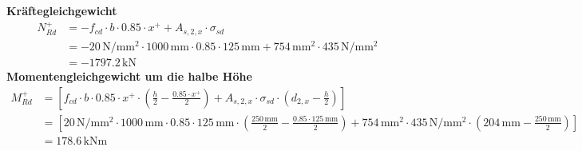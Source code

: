 \documentclass[11pt,a4paper]{article}
\begin{document}
\noindent\textbf{Kräftegleichgewicht}
\begin{equation*}
\begin{aligned}
  N_{Rd}^{+} &= -f_{cd} \cdot b \cdot 0.85 \cdot x^{+} + A_{s,2,x} \cdot \sigma_{sd} \\
  &= -20\,\mathrm{N}/\mathrm{mm}^{2} \cdot 1000\,\mathrm{mm} \cdot 0.85 \cdot 125\,\mathrm{mm} + 754\,\mathrm{mm}^{2} \cdot 435\,\mathrm{N}/\mathrm{mm}^{2} \\
  &= -1797.2\,\mathrm{kN}
\end{aligned}
\end{equation*}
\noindent\textbf{Momentengleichgewicht um die halbe Höhe}
\begin{equation*}
\begin{aligned}
  M_{Rd}^{+} &= \left[f_{cd} \cdot b \cdot 0.85 \cdot x^{+} \cdot \left(\tfrac{h}{2} - \tfrac{0.85 \cdot x^{+}}{2}\right) + A_{s,2,x} \cdot \sigma_{sd} \cdot \left(d_{2,x} - \tfrac{h}{2}\right)\right] \\
  &= \left[20\,\mathrm{N}/\mathrm{mm}^{2} \cdot 1000\,\mathrm{mm} \cdot 0.85 \cdot 125\,\mathrm{mm} \cdot \left(\tfrac{250\,\mathrm{mm}}{2} - \tfrac{0.85 \cdot 125\,\mathrm{mm}}{2}\right) + 754\,\mathrm{mm}^{2} \cdot 435\,\mathrm{N}/\mathrm{mm}^{2} \cdot \left(204\,\mathrm{mm} - \tfrac{250\,\mathrm{mm}}{2}\right)\right] \\
  &= 178.6\,\mathrm{kNm}
\end{aligned}
\end{equation*}
\end{document}
